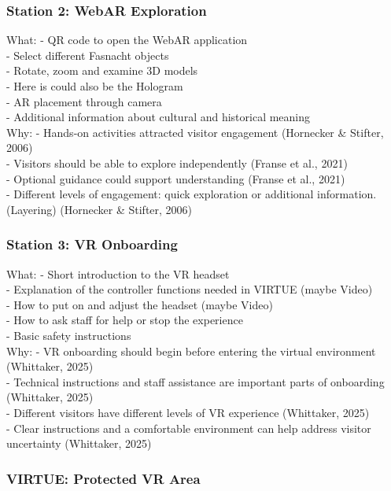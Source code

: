\documentclass{article}
\begin{document}
\subsubsection{Station 2: WebAR Exploration}

What:
- QR code to open the WebAR application
\\
- Select different Fasnacht objects
\\
- Rotate, zoom and examine 3D models
\\
- Here is could also be the Hologram
\\
- AR placement through camera
\\
- Additional information about cultural and historical meaning
\\
Why:
- Hands-on activities attracted visitor engagement (Hornecker & Stifter, 2006)
\\
- Visitors should be able to explore independently (Franse et al., 2021)
\\
- Optional guidance could support understanding (Franse et al., 2021)
\\
- Different levels of engagement: quick exploration or additional information. (Layering) (Hornecker & Stifter, 2006)
\\
\subsubsection{Station 3: VR Onboarding}

What:
- Short introduction to the VR headset
\\
- Explanation of the controller functions needed in VIRTUE (maybe Video)
\\
- How to put on and adjust the headset (maybe Video)
\\
- How to ask staff for help or stop the experience
\\
- Basic safety instructions
\\

Why:
- VR onboarding should begin before entering the virtual environment (Whittaker, 2025)
\\
- Technical instructions and staff assistance are important parts of onboarding (Whittaker, 2025)
\\
- Different visitors have different levels of VR experience (Whittaker, 2025)
\\
- Clear instructions and a comfortable environment can help address visitor uncertainty (Whittaker, 2025)


\subsubsection{VIRTUE: Protected VR Area}
\end{document}
